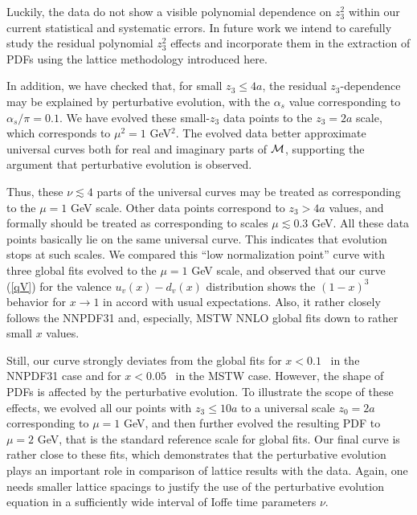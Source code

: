  Luckily, the  data do  not show a visible
polynomial dependence on $z_3^2$
within our current statistical and systematic errors. In future work we intend to carefully study
the residual polynomial  $z_3^2$
effects  and incorporate them in the extraction of PDFs using the lattice methodology introduced here.

 In addition,
 we have checked that, for small $z_3 \leq 4a$,  the residual  $z_3$-dependence
 may be explained by  perturbative evolution, with the $\alpha_s$ value
  corresponding to  $\alpha_s/\pi =0.1$. We have evolved these small-$z_3$
  data points to the $z_3=2a$ scale, which corresponds to $\mu^2=1$ GeV$^2$.
  The evolved data better approximate  universal curves both for real
  and imaginary parts of ${\cal M}$, supporting the argument that perturbative evolution is observed.

Thus, these  $ \nu \lesssim 4$ parts  of the     universal curves may be treated
as corresponding to the $\mu=1$ GeV  scale.
 Other  data points correspond
 to  $z_3  >4a$ values, and   formally should  be treated
 as corresponding to scales $\mu \lesssim 0.3$ GeV.
 All these data points basically lie on the
same universal curve.  This indicates that evolution stops at such scales.
We  compared  this  ``low normalization point''  curve
with three global fits evolved to the $\mu =1$ GeV scale,
and observed that  our curve (\ref{qV}) for the valence  $u_v(x)- d_v (x)$
distribution  shows
     the $(1-x)^3$ behavior for $x \to 1$  in accord with usual expectations.
     Also, it rather closely follows the NNPDF31  and,
 especially,   MSTW NNLO global fits down to rather  small  $x$ values.


 Still,   our curve  strongly deviates from the global fits   for \mbox{$x <0.1$  } in the NNPDF31  case
and for  \mbox{$x <0.05$  } in the MSTW case.
However, the shape of PDFs is  affected  by the perturbative evolution.  %
To illustrate the scope of these effects, we evolved all our points with $z_3 \leq 10a$   %
to a universal scale $z_0=2a$ corresponding to $\mu =1 $ GeV, %
and then further evolved the resulting PDF to  $\mu =2 $ GeV, %
that is the standard reference scale for global fits. %
Our final curve is rather close to these fits,
which demonstrates that the perturbative evolution
plays an important role in comparison of lattice results with the data.
Again, one needs smaller lattice spacings to justify the use
of the perturbative evolution equation in a sufficiently wide
interval of Ioffe time parameters $\nu$.


